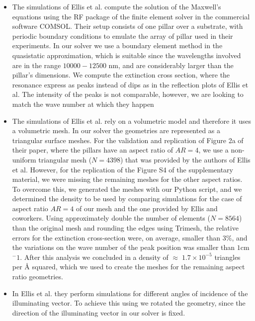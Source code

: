 \begin{itemize}

\item {The simulations of Ellis et al. compute the solution of the Maxwell's equations using the RF package
of the finite element solver in the commercial software COMSOL. Their setup consists of one pillar over a 
substrate, with periodic boundary conditions to emulate the array of pillar used in their experiments. In our 
solver we use a boundary element method in the quasistatic approximation, which is suitable since the wavelengths
involved are in the range $10000-12500$ nm, and are considerably larger than the pillar's dimensions. We compute 
the extinction cross section, where the resonance express as peaks instead of dips as in the reflection plots of 
Ellis et al. The intensity of the peaks is not comparable, however, we are looking to match the wave number at which
they happen}

\item {The simulations of Ellis et al. rely on a volumetric model and therefore it uses a volumetric mesh. In our 
solver the geometries are represented as a triangular surface meshes. For the validation and replication of Figure 2a of 
their paper, where the pillars have an aspect ratio of $AR=4$, we use a non-uniform triangular mesh ($N=4398$) that 
was provided by the authors of Ellis et al. However, for the replication of the Figure S4 of the supplementary material, 
we were missing the remaining meshes for the other aspect ratios. To overcome this, we generated the meshes with our Python 
script, and we determined the density to be used by comparing simulations for the case of aspect ratio $AR=4$ of our mesh and 
the one provided by Ellis and coworkers. Using approximately double the number of elements ($N=8564$) than the original mesh 
and rounding the edges using Trimesh, the relative errors for the extinction cross-section were, on average, smaller than 
$3\%$, and the variations on the wave number of the peak position was smaller than $1$cm$^-1$. After this analysis we 
concluded in a density of $\approx \; 1.7 \times10^{-5}$ triangles per $\text{\AA}$ squared, which we used to create the meshes
for the remaining aspect ratio geometries.}

\item {In Ellis et al. they perform simulations for different angles of incidence of the illuminating vector. To achieve this 
using \pygbe we rotated the geometry, since the direction of the illuminating vector in our solver is fixed.}
\end{itemize}

